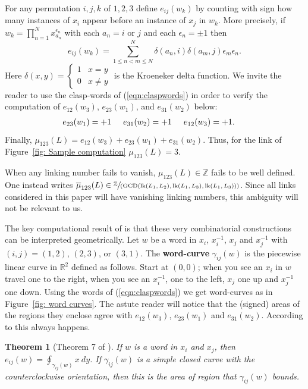 \documentclass[11pt]{amsart}
\newtheorem{theorem}{Theorem}
\theoremstyle{remark}
\newcommand{\lk}{\operatorname{lk}}
\newcommand{\Z}{\mathbb{Z}}
\newcommand{\R}{\mathbb{R}}
\newcommand{\Sum}{\displaystyle\sum}
\newcommand{\pref}[1]{(\ref{#1})}
\begin{document}
For any permutation $i,j,k$ of $1,2,3$ define $e_{ij}(w_k)$  by counting with sign how many instances of $x_i$ appear before an instance of $x_j$ in $w_k$.  More precisely, if $w_k = \prod_{n=1}^N x_{a_n}^{\epsilon_n}$ with each $a_n=i$ or $j$ and each $\epsilon_n=\pm1$ then 
$$
e_{ij}(w_k) = \Sum_{1\le n<m\le N}^N \delta(a_n,i)\delta(a_m,j) \epsilon_m\epsilon_n.
$$
Here $\delta(x,y) = \begin{cases}1&x=y\\0&x\neq y\end{cases}$ is the Kroeneker delta function.  We invite the reader to use the clasp-words of \pref{eqn:claspwords} in order to verify the computation of  $e_{12}(w_3)$, $e_{23}(w_1)$, and $e_{31}(w_2)$ below:
$$\begin{array}{rcl}
e_{23}(w_1)=+1\hspace{5mm} 
e_{31}(w_2)=+1\hspace{5mm} 
e_{12}(w_3)=+1.\hspace{5mm}
\end{array}
$$
Finally,  $\mu_{123}(L) = e_{12}(w_3)+e_{23}(w_1)+e_{31}(w_2)$. Thus, for the link of Figure~\ref{fig: Sample computation} $\mu_{123}(L)=3$.  

When any linking number fails to vanish, $\mu_{123}(L)\in \Z$ fails to be well defined.  One instead writes $\overline{\mu}_{123}(L)\in \sfrac{\Z}{(\operatorname{GCD}(\lk(L_1,L_2),\lk(L_1,L_3),\lk(L_1,L_3)))}$.  Since all links considered in this paper will have vanishing linking numbers, this ambiguity will not be relevant to us. 

The key computational result of \cite{AADG20} is that these very combinatorial constructions can be interpreted geometrically.  Let $w$ be a word in $x_i$, $x_i^{-1}$, $x_j$ and $x_j^{-1}$ with $(i,j)=(1,2)$, $(2,3)$, or $(3,1)$.  The \textbf{word-curve} $\gamma_{ij}(w)$ is the piecewise linear curve in $\R^2$ defined as follows.  Start at $(0,0)$; when you see an $x_i$ in $w$ travel one to the right, when you see an $x_i^{-1}$, one to the left, $x_j$ one up and $x_j^{-1}$ one down.  Using the words of \pref{eqn:claspwords} we get word-curves as in Figure~\ref{fig: word curves}.  The astute reader will notice that the (signed) areas of the regions they enclose agree with $e_{12}(w_3)$, $e_{23}(w_1)$ and $e_{31}(w_2)$.  According to \cite{AADG20} this always happens.
\begin{theorem}[Theorem 7 of \cite{AADG20}]\label{AADG theorem}
If $w$ is a word in $x_i$ and $x_j$, then $e_{ij}(w) = \displaystyle\oint_{\gamma_{ij}(w)} x~dy$.  If $\gamma_{ij}(w)$ is a simple closed curve with the counterclockwise orientation, then this is the area of region that $\gamma_{ij}(w)$ bounds.  
\end{theorem}
\end{document}
